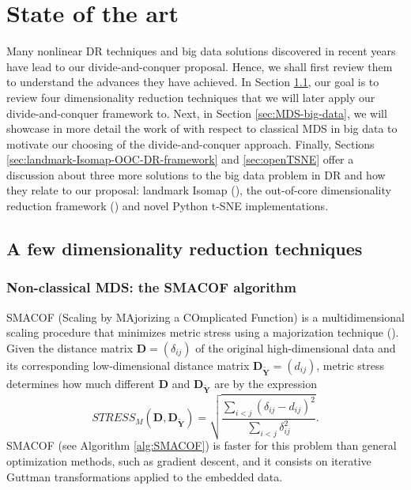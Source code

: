 \section{State of the art}

Many nonlinear DR techniques and big data solutions discovered in recent years have lead to our divide-and-conquer proposal. Hence, we shall first review them to understand the advances they have achieved. In Section \ref{sec:DR-techniques}, our goal is to review four dimensionality reduction techniques that we will later apply our divide-and-conquer framework to. Next, in Section \ref{sec:MDS-big-data}, we will showcase in more detail the work of \citet{Delicado2024} with respect to classical MDS in big data to motivate our choosing of the divide-and-conquer approach. Finally, Sections \ref{sec:landmark-Isomap-OOC-DR-framework} and \ref{sec:openTSNE} offer a discussion about three more solutions to the big data problem in DR and how they relate to our proposal: landmark Isomap (\cite{Silva2002}), the out-of-core dimensionality reduction framework (\cite{Reichmann2024}) and novel Python t-SNE implementations.

\subsection{A few dimensionality reduction techniques}
\label{sec:DR-techniques}

\subsubsection{Non-classical MDS: the SMACOF algorithm}

SMACOF (Scaling by MAjorizing a COmplicated Function) is a multidimensional scaling procedure that minimizes metric stress using a majorization technique (\cite{Kruskal1964a,Kruskal1964b}). Given the distance matrix $\mathbf{D} = (\delta_{ij})$ of the original high-dimensional data and its corresponding low-dimensional distance matrix $\mathbf{D}_{\mathbf{\tilde{Y}}} = (d_{ij})$, metric stress determines how much different $\mathbf{D}$ and $\mathbf{D}_{\mathbf{\tilde{Y}}}$ are by the expression
$$
STRESS_M(\mathbf{D}, \mathbf{D}_{\mathbf{\tilde{Y}}}) = \sqrt{\frac{\sum_{i<j}\left(\delta_{i j}-d_{i j}\right)^2}{\sum_{i<j} \delta_{i j}^2}}.
$$
SMACOF (see Algorithm \ref{alg:SMACOF}) is faster for this problem than general optimization methods, such as gradient descent, and it consists on iterative Guttman transformations \citep{Guttman1968} applied to the embedded data.


